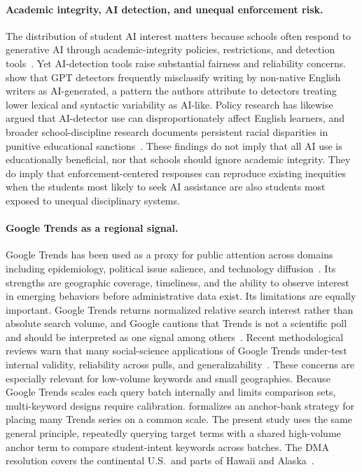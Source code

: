\documentclass[11pt]{article}
\begin{document}
\paragraph{Academic integrity, AI detection, and unequal enforcement risk.}
The distribution of student AI interest matters because schools often respond to generative AI through academic-integrity policies, restrictions, and detection tools~\citep{laird2025}. Yet AI-detection tools raise substantial fairness and reliability concerns. \citet{liang2023} show that GPT detectors frequently misclassify writing by non-native English writers as AI-generated, a pattern the authors attribute to detectors treating lower lexical and syntactic variability as AI-like. Policy research has likewise argued that AI-detector use can disproportionately affect English learners, and broader school-discipline research documents persistent racial disparities in punitive educational sanctions~\citep{woelfel2023, darlinghammond2024}. These findings do not imply that all AI use is educationally beneficial, nor that schools should ignore academic integrity. They do imply that enforcement-centered responses can reproduce existing inequities when the students most likely to seek AI assistance are also students most exposed to unequal disciplinary systems.

\paragraph{Google Trends as a regional signal.}
Google Trends has been used as a proxy for public attention across domains including epidemiology, political issue salience, and technology diffusion~\citep{choi2012, mellon2014, jun2018}. Its strengths are geographic coverage, timeliness, and the ability to observe interest in emerging behaviors before administrative data exist. Its limitations are equally important. Google Trends returns normalized relative search interest rather than absolute search volume, and Google cautions that Trends is not a scientific poll and should be interpreted as one signal among others~\citep{googletrends}. Recent methodological reviews warn that many social-science applications of Google Trends under-test internal validity, reliability across pulls, and generalizability~\citep{holzl2025}. These concerns are especially relevant for low-volume keywords and small geographies. Because Google Trends scales each query batch internally and limits comparison sets, multi-keyword designs require calibration. \citet{west2020} formalizes an anchor-bank strategy for placing many Trends series on a common scale. The present study uses the same general principle, repeatedly querying target terms with a shared high-volume anchor term to compare student-intent keywords across batches. The DMA resolution covers the continental U.S.\ and parts of Hawaii and Alaska~\citep{nielsen2025}.
\end{document}
